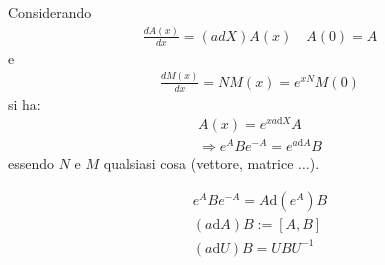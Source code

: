Considerando
\begin{equation}\begin{split}
\frac{dA\left(x\right)}{dx}=\left(adX\right)A\left(x\right) \quad A\left(0\right)=A
\end{split}\end{equation}
e
\begin{equation}\begin{split}
\frac{dM\left(x\right)}{dx}=NM\left(x\right)=e^{xN}M\left(0\right)
\end{split}\end{equation}
si ha:
\begin{equation}\begin{split}
A\left(x\right)=e^{xa\textrm{d}X}A \\
\Longrightarrow e^ABe^{-A}=e^{a\textrm{d}A}B
\end{split}\end{equation}
essendo $N$ e $M$ qualsiasi cosa (vettore, matrice $\dots$).

\begin{equation}\begin{split}
e^ABe^{-A}=A\textrm{d}\left(e^A\right)B \\
\left(a\textrm{d}A\right)B:=\left[A,B\right] \\
\left(a\textrm{d}U\right)B=UBU^{-1}
\end{split}\end{equation}